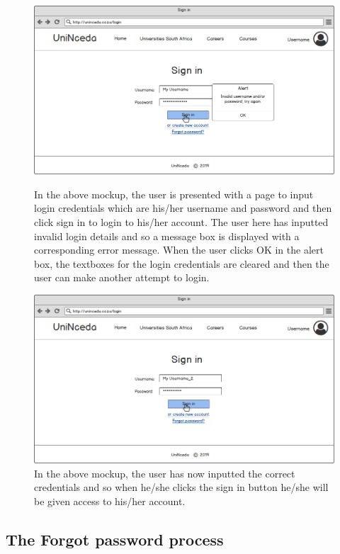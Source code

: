 \documentclass[a4paper, 12pt]{article}
\begin{document}
\begin{figure}[H]
\centering
\includegraphics[scale=0.5]{LoginPageInvalidCredentials}
\caption{\small In the above mockup, the user is presented with a page to input login credentials which are his/her username and password and then click sign in to login to his/her account. The user here has inputted invalid login details and so a message box is displayed with a corresponding error message. When the user clicks OK in the alert box, the textboxes for the login credentials are cleared and then the user can make another attempt to login.}
\label{LoginPageInvalidCredentials}

\setcounter{figure}{0}
\vspace{1cm}

\includegraphics[scale=0.5]{LoginPage}
\caption{\small In the above mockup, the user has now inputted the correct credentials and so when he/she clicks the sign in  button he/she will be given access to his/her account.}
\label{LoginPage}
\end{figure}

\subsection{The Forgot password process}
\end{document}
